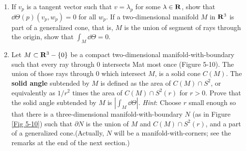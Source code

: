 \begin{problems}
{\begin{enumerate}[label=(\alph*)]
                For $r>0$ let $S^2(r)=\{x\in\F{R}^3:|x|=r\}$. Show that $\omega$ restricted to the  
                tangent space of $S^2(r)$ is $1/r^2$ times the volume element, and that $\int_{S^2(r)}\omega=4\pi$.
                Conclude that $\omega$ is not exact. Nevertheless we denoted $\omega$ by $\dd\Theta$ since, as we 
                shall see, $\dd\Theta$ is the analogue of the 1-form $\dd\theta$ on $\F{R}^2-\{0\}$.
            \item If $v_p$ is a tangent vector such that $v=\lambda_p$ for some $\lambda\in\mathbf{R}$, show that 
                $\dd\Theta(p)(v_p,w_p)=0$ for all $w_p$. If a two-dimensional manifold $M$ in $\mathbf{R}^3$ is
                part of a generalized cone, that is, $M$ is the union of segment of rays through the origin, show
                that $\int_M\dd\Theta =0$. 
            \item Let $M\subset\mathbf{R}^3-\{0\}$ be a compact two-dimensional manifold-with-boundary 
                such that every ray through 0 intersects Mat most once (Figure 5-10).
                The union of those rays through 0 which intersect $M$, is a solid cone $C(M)$. 
                The \textbf{solid angle} subtended by $M$ is defined as the area of $C(M)\cap S^2$, or 
                equivalently as $1/r^2$ times the area of $C(M)\cap S^2(r)$ for $r > 0$.
                Prove that the solid angle subtended by $M$ is $|\int_M\dd\Theta|$.
                \textit{Hint}: Choose $r$ small enough so that there is a three-dimensional 
                manifold-with-boundary $N$ (as in Figure \ref{Fig 5-10}) such that $\partial N$ is the 
                union of $M$ and $C(M)\cap S^2(r)$, and a part of a generalized cone.(Actually, $N$ 
                will be a manifold-with-corners; see the remarks at the end of the next section.)

        \end{enumerate}
    }
\end{problems}
